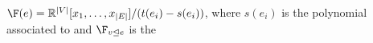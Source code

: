   $\F(e) = \mathbb{R}^{|V|}[x_1, \ldots, x_{|E|}] / (t(e_i) - s(e_i))$, where $s(e_i)$ is the polynomial associated to  and $\F_{v \trianglelefteq e}$ is the
